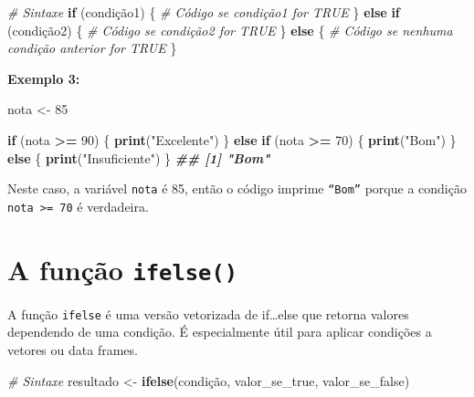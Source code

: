 \documentclass[
]{book}
\newenvironment{Shaded}{\begin{snugshade}}{\end{snugshade}}
\newcommand{\CommentTok}[1]{\textcolor[rgb]{0.56,0.35,0.01}{\textit{#1}}}
\newcommand{\ControlFlowTok}[1]{\textcolor[rgb]{0.13,0.29,0.53}{\textbf{#1}}}
\newcommand{\DecValTok}[1]{\textcolor[rgb]{0.00,0.00,0.81}{#1}}
\newcommand{\DocumentationTok}[1]{\textcolor[rgb]{0.56,0.35,0.01}{\textbf{\textit{#1}}}}
\newcommand{\FunctionTok}[1]{\textcolor[rgb]{0.13,0.29,0.53}{\textbf{#1}}}
\newcommand{\NormalTok}[1]{#1}
\newcommand{\OtherTok}[1]{\textcolor[rgb]{0.56,0.35,0.01}{#1}}
\newcommand{\SpecialCharTok}[1]{\textcolor[rgb]{0.81,0.36,0.00}{\textbf{#1}}}
\newcommand{\StringTok}[1]{\textcolor[rgb]{0.31,0.60,0.02}{#1}}
\begin{document}
\begin{Shaded}
\begin{Highlighting}[]
\CommentTok{\# Sintaxe}
\ControlFlowTok{if}\NormalTok{ (condição1) \{}
      \CommentTok{\# Código se condição1 for TRUE}
\NormalTok{\} }\ControlFlowTok{else} \ControlFlowTok{if}\NormalTok{ (condição2) \{}
      \CommentTok{\# Código se condição2 for TRUE}
\NormalTok{\} }\ControlFlowTok{else}\NormalTok{ \{}
      \CommentTok{\# Código se nenhuma condição anterior for TRUE}
\NormalTok{\}}
\end{Highlighting}
\end{Shaded}

\textbf{Exemplo 3:}

\begin{Shaded}
\begin{Highlighting}[]
\NormalTok{nota }\OtherTok{\textless{}{-}} \DecValTok{85}

\ControlFlowTok{if}\NormalTok{ (nota }\SpecialCharTok{\textgreater{}=} \DecValTok{90}\NormalTok{) \{}
  \FunctionTok{print}\NormalTok{(}\StringTok{"Excelente"}\NormalTok{)}
\NormalTok{\} }\ControlFlowTok{else} \ControlFlowTok{if}\NormalTok{ (nota }\SpecialCharTok{\textgreater{}=} \DecValTok{70}\NormalTok{) \{}
  \FunctionTok{print}\NormalTok{(}\StringTok{"Bom"}\NormalTok{)}
\NormalTok{\} }\ControlFlowTok{else}\NormalTok{ \{}
  \FunctionTok{print}\NormalTok{(}\StringTok{"Insuficiente"}\NormalTok{)}
\NormalTok{\}}
\DocumentationTok{\#\# [1] "Bom"}
\end{Highlighting}
\end{Shaded}

Neste caso, a variável \texttt{nota} é 85, então o código imprime \texttt{“Bom”}
porque a condição \texttt{nota\ \textgreater{}=\ 70} é verdadeira.

\section{\texorpdfstring{A função \texttt{ifelse()}}{A função ifelse()}}\label{a-funuxe7uxe3o-ifelse}

A função \texttt{ifelse} é uma versão vetorizada de if\ldots else que retorna
valores dependendo de uma condição. É especialmente útil para aplicar
condições a vetores ou data frames.

\begin{Shaded}
\begin{Highlighting}[]
\CommentTok{\# Sintaxe}
\NormalTok{resultado }\OtherTok{\textless{}{-}} \FunctionTok{ifelse}\NormalTok{(condição, valor\_se\_true, valor\_se\_false)}
\end{Highlighting}
\end{Shaded}
\end{document}
